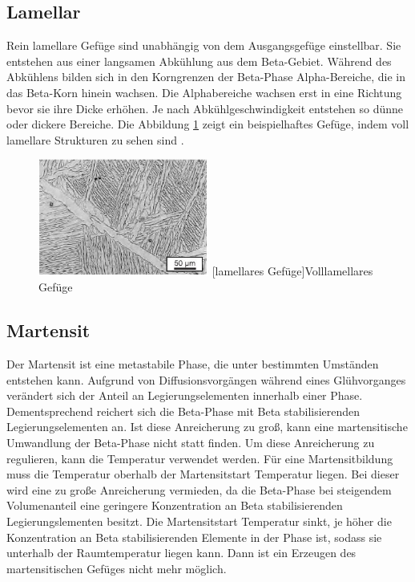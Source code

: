\documentclass[a4paper, 11pt]{tubsreprt}
\begin{document}
\subsection{Lamellar} \label{section Gefüge Lamellar}
Rein lamellare Gefüge sind unabhängig von dem Ausgangsgefüge einstellbar. Sie entstehen aus einer langsamen Abkühlung aus dem Beta-Gebiet. Während des Abkühlens bilden sich in den Korngrenzen der Beta-Phase Alpha-Bereiche, die in das Beta-Korn hinein wachsen. Die Alphabereiche wachsen erst in eine Richtung bevor sie ihre Dicke erhöhen. Je nach Abkühlgeschwindigkeit entstehen so dünne oder dickere Bereiche. Die Abbildung \ref{lamellar} zeigt ein beispielhaftes Gefüge, indem voll lamellare Strukturen zu sehen sind \cite{Luetjering2007}.


\begin{figure}
	\centering
		\includegraphics[width=0.5\textwidth]{Bilder/lamellar.jpg}
		[lamellares Gefüge]{Volllamellares Gefüge \cite{Leyens2002}}
		\label{lamellar}
		
\end{figure}
\newpage
\subsection{Martensit}
Der Martensit ist eine metastabile Phase, die unter bestimmten Umständen entstehen kann. Aufgrund von Diffusionsvorgängen während eines Glühvorganges verändert sich der Anteil an Legierungselementen innerhalb einer Phase. Dementsprechend reichert sich die Beta-Phase mit Beta stabilisierenden Legierungselementen an. Ist diese Anreicherung zu groß, kann eine martensitische Umwandlung der Beta-Phase nicht statt finden. Um diese Anreicherung zu regulieren, kann die Temperatur verwendet werden. Für eine Martensitbildung muss die Temperatur oberhalb der Martensitstart Temperatur liegen. Bei dieser wird eine zu große Anreicherung vermieden, da die Beta-Phase bei steigendem Volumenanteil eine geringere Konzentration an Beta stabilisierenden Legierungslementen besitzt. Die Martensitstart Temperatur sinkt, je höher die Konzentration an Beta stabilisierenden Elemente in der Phase ist, sodass sie unterhalb der Raumtemperatur liegen kann. Dann ist ein Erzeugen des martensitischen Gefüges nicht mehr möglich.
\end{document}
